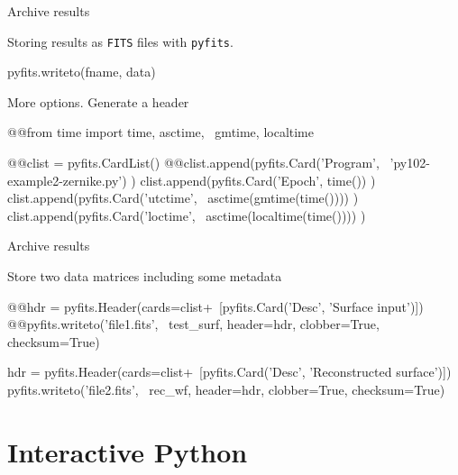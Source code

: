 \documentclass[xetex,10pt]{beamer}
\def\pythoni{\lstinline[language=pythontim]}
\def\spacer{\vspace*{1em}}
\begin{document}
\begin{frame}[fragile]{Archive results}

Storing results as \texttt{FITS} files with \pythoni{pyfits}.

\begin{python}
pyfits.writeto(fname, data)
\end{python}

\spacer
\pause
More options. Generate a header

\begin{pythonln}[firstnumber=159]
@@from time import time, asctime, \
  gmtime, localtime

@@clist = pyfits.CardList()
@@clist.append(pyfits.Card('Program', \
  'py102-example2-zernike.py') )
clist.append(pyfits.Card('Epoch', time()) )
clist.append(pyfits.Card('utctime', \
  asctime(gmtime(time()))) )
clist.append(pyfits.Card('loctime', \
  asctime(localtime(time()))) )
\end{pythonln}

\end{frame}

\begin{frame}[fragile]{Archive results}

Store two data matrices including some metadata

\spacer

\begin{pythonln}[firstnumber=165]
@@hdr = pyfits.Header(cards=clist+\
  [pyfits.Card('Desc', 'Surface input')])
@@pyfits.writeto('file1.fits', \
  test_surf, header=hdr, clobber=True, checksum=True)

hdr = pyfits.Header(cards=clist+\
  [pyfits.Card('Desc', 'Reconstructed surface')])
pyfits.writeto('file2.fits', \
  rec_wf, header=hdr, clobber=True, checksum=True)
\end{pythonln}

\end{frame}


\section{Interactive Python}
\end{document}
